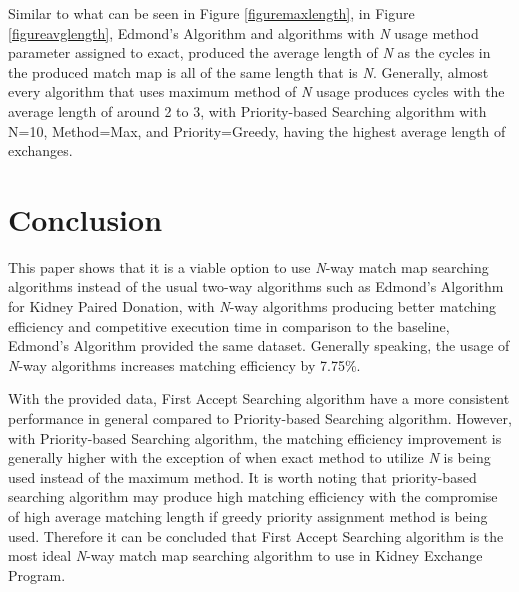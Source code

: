 \documentclass[conference]{IEEEtran}
\begin{document}
Similar to what can be seen in Figure \ref{figuremaxlength}, in Figure \ref{figureavglength}, Edmond's Algorithm and algorithms with
\textit{N} usage method parameter assigned to exact, produced the average length of \textit{N} as the cycles in the produced match map is all
of the same length that is \textit{N}. Generally, almost every algorithm that uses maximum method of \textit{N} usage produces cycles with the
average length of around 2 to 3, with Priority-based Searching algorithm with N=10, Method=Max, and Priority=Greedy, having the highest
average length of exchanges.

\section{Conclusion}
This paper shows that it is a viable option to use \textit{N}-way match map searching algorithms instead of the usual two-way
algorithms such as Edmond's Algorithm for Kidney Paired Donation, with \textit{N}-way algorithms producing better matching efficiency
and competitive execution time in comparison to the baseline, Edmond's Algorithm provided the same dataset. Generally speaking,
the usage of \textit{N}-way algorithms increases matching efficiency by 7.75\%.

With the provided data, First Accept Searching algorithm have a more consistent performance in general compared to Priority-based Searching
algorithm. However, with Priority-based Searching algorithm, the matching efficiency improvement is generally higher with the exception of
when exact method to utilize \textit{N} is being used instead of the maximum method. It is worth noting that priority-based searching
algorithm may produce high matching efficiency with the compromise of high average matching length if greedy priority assignment method is being
used. Therefore it can be concluded that First Accept Searching algorithm is the most ideal \textit{N}-way match map searching algorithm to use
in Kidney Exchange Program.
\end{document}
